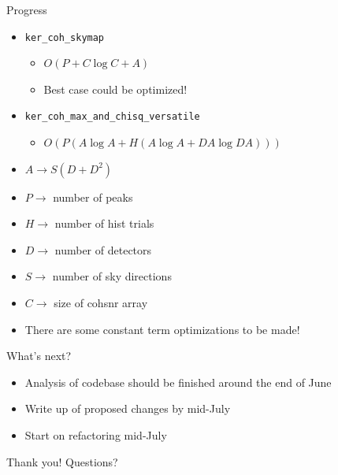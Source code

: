 \documentclass{beamer}
\begin{document}
\begin{frame}{Progress}
    \begin{itemize}
        \item \texttt{ker\_coh\_skymap}
            \begin{itemize}
                \item \(O(P + C\log{C} + A)\)
                \item Best case could be optimized!
            \end{itemize}
        \item \texttt{ker\_coh\_max\_and\_chisq\_versatile}
            \begin{itemize}
                \item \(O(P(A\log{A} + H(A\log{A} + DA\log{DA})))\)
            \end{itemize}
        \pause{} \item \(A \rightarrow S(D+D^2)\)
        \item \(P \rightarrow\) number of peaks
        \item \(H \rightarrow\) number of hist trials
        \item \(D \rightarrow\) number of detectors
        \item \(S \rightarrow\) number of sky directions
        \item \(C \rightarrow\) size of cohsnr array
        \pause{} \item There are some constant term optimizations to be made!
    \end{itemize}
\end{frame}
\begin{frame}{What's next?}
    \begin{itemize}
        \pause{} \item Analysis of codebase should be finished around the end
            of June
        \pause{} \item Write up of proposed changes by mid-July
        \pause{} \item Start on refactoring mid-July
    \end{itemize}
\end{frame}
\begin{frame}
    \centering
    \begin{block}{\centering Thank you!}
        \centering
        Questions?
    \end{block}
\end{frame}
\end{document}
